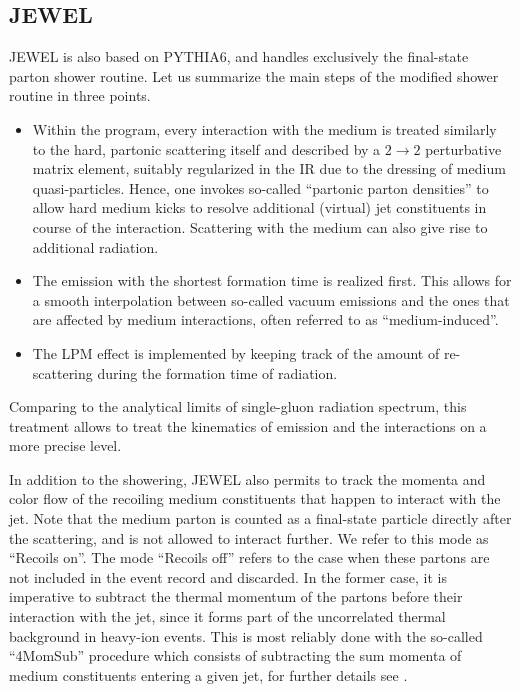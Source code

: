 \subsection{JEWEL}
\label{app:jewel}

JEWEL is also based on PYTHIA6, and handles exclusively the final-state parton shower routine. Let us summarize the main steps of the modified shower routine in three points.
\begin{itemize}

\item Within the program, every interaction with the medium is treated similarly to the hard, partonic scattering itself and described by a $2 \to 2$ perturbative matrix element, suitably regularized in the IR due to the dressing of medium quasi-particles. Hence, one invokes so-called ``partonic parton densities'' to allow hard medium kicks to resolve additional (virtual) jet constituents in course of the interaction. Scattering with the medium can also give rise to additional radiation.

\item The emission with the shortest formation time is realized first. This allows for a smooth interpolation between so-called vacuum emissions and the ones that are affected by medium interactions, often referred to as ``medium-induced''.

\item The LPM effect is implemented by keeping track of the amount of re-scattering during the formation time of radiation.
\end{itemize}
Comparing to the analytical limits of single-gluon radiation spectrum, this treatment allows to treat the kinematics of emission and the interactions on a more precise level.

In addition to the showering, JEWEL also permits to track the momenta and color flow of the recoiling medium constituents that happen to interact with the jet. Note that the medium parton is counted as a final-state particle directly after the scattering, and is not allowed to interact further. We refer to this mode as ``Recoils on''. The mode ``Recoils off'' refers to the case when these partons are not included in the event record and discarded. In the former case, it is imperative to subtract the thermal momentum of the partons before their interaction with the jet, since it forms part of the uncorrelated  thermal background in heavy-ion events. This is most reliably done with the so-called ``4MomSub'' procedure which consists of subtracting the sum momenta of medium constituents entering a given jet, for further details see \cite{KunnawalkamElayavalli:2017hxo}. 
